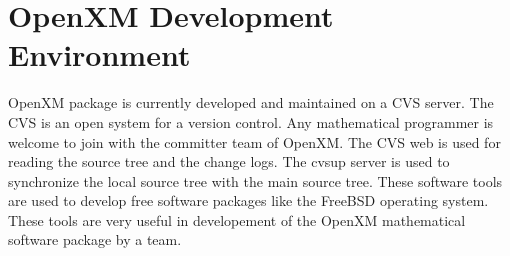 
\section{OpenXM Development Environment}  

OpenXM package is currently developed and maintained on
a CVS server.
The CVS is an open system for a version control.
Any mathematical programmer is welcome to
join with the committer team of OpenXM.
The CVS web is used for reading the source tree and the change logs.
The cvsup server is used to synchronize the local source tree with
the main source tree.
These software tools are used to develop free software packages
like the FreeBSD operating system.
These tools are very useful in developement
of the OpenXM mathematical software package by a team.
